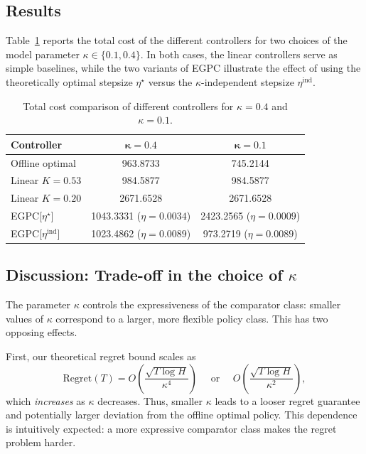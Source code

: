 \documentclass[11pt]{article}
\begin{document}
\subsection{Results}

Table~\ref{tab:kappa_results} reports the total cost of the different controllers for two
choices of the model parameter $\kappa \in \{0.1, 0.4\}$. In both cases, the linear
controllers serve as simple baselines, while the two variants of EGPC illustrate the
effect of using the theoretically optimal stepsize $\eta^\star$ versus the
$\kappa$-independent stepsize $\eta^{\mathrm{ind}}$.

\begin{table}[H]
\centering
\caption{Total cost comparison of different controllers for $\kappa = 0.4$ and $\kappa = 0.1$.}
\label{tab:kappa_results}
\begin{tabular}{lcc}
\hline
\textbf{Controller} 
    & $\boldsymbol{\kappa = 0.4}$ 
    & $\boldsymbol{\kappa = 0.1}$ \\
\hline
Offline optimal          
    & 963.8733 
    & 745.2144 \\[0.2em]
Linear $K = 0.53$        
    & 984.5877 
    & 984.5877 \\[0.2em]
Linear $K = 0.20$        
    & 2671.6528 
    & 2671.6528 \\[0.2em]
EGPC[$\eta^\star$]       
    & 1043.3331 \; ($\eta = 0.0034$) 
    & 2423.2565 \; ($\eta = 0.0009$) \\[0.2em]
EGPC[$\eta^{\mathrm{ind}}$] 
    & 1023.4862 \; ($\eta = 0.0089$) 
    & 973.2719 \; ($\eta = 0.0089$) \\
\hline
\end{tabular}
\end{table}

\subsection{Discussion: Trade-off in the choice of $\kappa$}

The parameter $\kappa$ controls the expressiveness of the comparator class: smaller
values of $\kappa$ correspond to a larger, more flexible policy class. This has two
opposing effects.

First, our theoretical regret bound scales as
\[
    \mathrm{Regret}(T) = O\!\left( \frac{\sqrt{T \log H}}{\kappa^4} \right)\quad  \text{ or }\quad O\!\left( \frac{\sqrt{T \log H}}{\kappa^2} \right),
\]
which \emph{increases} as $\kappa$ decreases. Thus, smaller $\kappa$ leads to a looser
regret guarantee and potentially larger deviation from the offline optimal policy.
This dependence is intuitively expected: a more expressive comparator class makes the
regret problem harder.
\end{document}
